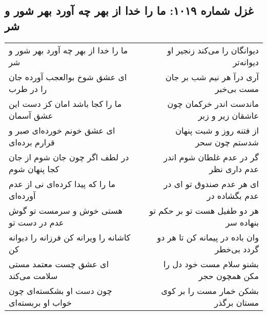 \begin{center}
\section*{غزل شماره ۱۰۱۹: ما را خدا از بهر چه آورد بهر شور و شر}
\label{sec:1019}
\begin{longtable}{l p{0.5cm} r}
ما را خدا از بهر چه آورد بهر شور و شر
&&
دیوانگان را می‌کند زنجیر او دیوانه‌تر
\\
ای عشق شوخ بوالعجب آورده جان را در طرب
&&
آری درآ هر نیم شب بر جان مست بی‌خبر
\\
ما را کجا باشد امان کز دست این عشق آسمان
&&
ماندست اندر خرکمان چون عاشقان زیر و زبر
\\
ای عشق خونم خورده‌ای صبر و قرارم برده‌ای
&&
از فتنه روز و شبت پنهان شدستم چون سحر
\\
در لطف اگر چون جان شوم از جان کجا پنهان شوم
&&
گر در عدم غلطان شوم اندر عدم داری نظر
\\
ما را که پیدا کرده‌ای نی از عدم آورده‌ای
&&
ای هر عدم صندوق تو ای در عدم بگشاده در
\\
هستی خوش و سرمست تو گوش عدم در دست تو
&&
هر دو طفیل هست تو بر حکم تو بنهاده سر
\\
کاشانه را ویرانه کن فرزانه را دیوانه کن
&&
وان باده در پیمانه کن تا هر دو گردد بی‌خطر
\\
ای عشق چست معتمد مستی سلامت می‌کند
&&
بشنو سلام مست خود دل را مکن همچون حجر
\\
چون دست او بشکسته‌ای چون خواب او بربسته‌ای
&&
بشکن خمار مست را بر کوی مستان برگذر
\\
\end{longtable}
\end{center}

